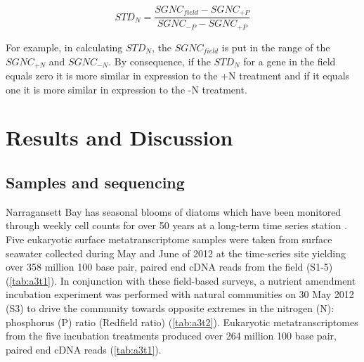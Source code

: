 \begin{equation}
	\label{eq:STDP}
	STD_N = \frac{SGNC_{field} - SGNC_{+P}}{SGNC_{-P} - SGNC_{+P}} 	
\end{equation}

For example, in calculating $STD_N$, the $SGNC_{field}$ is put in the range of the $SGNC_{+N}$ and $SGNC_{-N}$. By consequence, if the $STD_N$ for a gene in the field equals zero it is more similar in expression to the +N treatment and if it equals one it is more similar in expression to the -N treatment. 


\section{Results and Discussion}
\subsection{Samples and sequencing}
Narragansett Bay has seasonal blooms of diatoms which have been monitored through weekly cell counts for over 50 years at a long-term time series station \citep{Borkman2009, Li1998}. Five eukaryotic surface metatranscriptome samples were taken from surface seawater collected during May and June of 2012 at the time-series site yielding over 358 million 100 base pair, paired end cDNA reads from the field (S1-5) (\cref{tab:a3t1}). In conjunction with these field-based surveys, a nutrient amendment incubation experiment was performed with natural communities on 30 May 2012 (S3) to drive the community towards opposite extremes in the nitrogen (N): phosphorus (P) ratio (Redfield ratio) (\cref{tab:a3t2}). Eukaryotic metatranscriptomes from the five incubation treatments produced over 264 million 100 base pair, paired end cDNA reads (\cref{tab:a3t1}).\par

